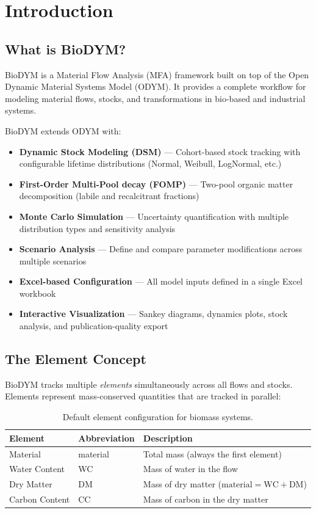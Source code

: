 \chapter{Introduction}
\label{ch:introduction}

\section{What is BioDYM?}

BioDYM is a Material Flow Analysis (MFA) framework built on top of the Open Dynamic Material Systems Model (ODYM). It provides a complete workflow for modeling material flows, stocks, and transformations in bio-based and industrial systems.

BioDYM extends ODYM with:
\begin{itemize}
  \item \textbf{Dynamic Stock Modeling (DSM)} --- Cohort-based stock tracking with configurable lifetime distributions (Normal, Weibull, LogNormal, etc.)
  \item \textbf{First-Order Multi-Pool decay (FOMP)} --- Two-pool organic matter decomposition (labile and recalcitrant fractions)
  \item \textbf{Monte Carlo Simulation} --- Uncertainty quantification with multiple distribution types and sensitivity analysis
  \item \textbf{Scenario Analysis} --- Define and compare parameter modifications across multiple scenarios
  \item \textbf{Excel-based Configuration} --- All model inputs defined in a single Excel workbook
  \item \textbf{Interactive Visualization} --- Sankey diagrams, dynamics plots, stock analysis, and publication-quality export
\end{itemize}

\section{The Element Concept}

BioDYM tracks multiple \emph{elements} simultaneously across all flows and stocks. Elements represent mass-conserved quantities that are tracked in parallel:

\begin{table}[h]
\centering
\begin{tabular}{llp{7cm}}
\toprule
\textbf{Element} & \textbf{Abbreviation} & \textbf{Description} \\
\midrule
Material & material & Total mass (always the first element) \\
Water Content & WC & Mass of water in the flow \\
Dry Matter & DM & Mass of dry matter ($\text{material} = \text{WC} + \text{DM}$) \\
Carbon Content & CC & Mass of carbon in the dry matter \\
\bottomrule
\end{tabular}
\caption{Default element configuration for biomass systems.}
\label{tab:elements}
\end{table}

